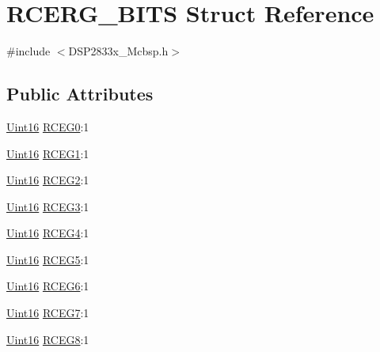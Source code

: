 \hypertarget{struct_r_c_e_r_g___b_i_t_s}{}\section{R\+C\+E\+R\+G\+\_\+\+B\+I\+T\+S Struct Reference}
\label{struct_r_c_e_r_g___b_i_t_s}


{\ttfamily \#include $<$D\+S\+P2833x\+\_\+\+Mcbsp.\+h$>$}

\subsection*{Public Attributes}
\begin{DoxyCompactItemize}
\item 
\hyperlink{_d_s_p2833x___device_8h_a59a9f6be4562c327cbfb4f7e8e18f08b}{Uint16} \hyperlink{struct_r_c_e_r_g___b_i_t_s_ac7e8c66490a11cf78d2d84137c4c1199}{R\+C\+E\+G0}\+:1
\item 
\hyperlink{_d_s_p2833x___device_8h_a59a9f6be4562c327cbfb4f7e8e18f08b}{Uint16} \hyperlink{struct_r_c_e_r_g___b_i_t_s_adff1f4f5e3f92fcac48b63d3373fcbae}{R\+C\+E\+G1}\+:1
\item 
\hyperlink{_d_s_p2833x___device_8h_a59a9f6be4562c327cbfb4f7e8e18f08b}{Uint16} \hyperlink{struct_r_c_e_r_g___b_i_t_s_a6e9a4642c25b895982d556ad4b9b5955}{R\+C\+E\+G2}\+:1
\item 
\hyperlink{_d_s_p2833x___device_8h_a59a9f6be4562c327cbfb4f7e8e18f08b}{Uint16} \hyperlink{struct_r_c_e_r_g___b_i_t_s_aca75613b41cbd9458f008501850527a0}{R\+C\+E\+G3}\+:1
\item 
\hyperlink{_d_s_p2833x___device_8h_a59a9f6be4562c327cbfb4f7e8e18f08b}{Uint16} \hyperlink{struct_r_c_e_r_g___b_i_t_s_a60858c4661110777d4750b080d5e786a}{R\+C\+E\+G4}\+:1
\item 
\hyperlink{_d_s_p2833x___device_8h_a59a9f6be4562c327cbfb4f7e8e18f08b}{Uint16} \hyperlink{struct_r_c_e_r_g___b_i_t_s_a262b2bc03ef92d7a0e7e827b1ba79d8b}{R\+C\+E\+G5}\+:1
\item 
\hyperlink{_d_s_p2833x___device_8h_a59a9f6be4562c327cbfb4f7e8e18f08b}{Uint16} \hyperlink{struct_r_c_e_r_g___b_i_t_s_a8948b5cf67bda66b92a733c96e05a37e}{R\+C\+E\+G6}\+:1
\item 
\hyperlink{_d_s_p2833x___device_8h_a59a9f6be4562c327cbfb4f7e8e18f08b}{Uint16} \hyperlink{struct_r_c_e_r_g___b_i_t_s_add2a5c26eb3b0be17fa16aa8a5a8e3b3}{R\+C\+E\+G7}\+:1
\item 
\hyperlink{_d_s_p2833x___device_8h_a59a9f6be4562c327cbfb4f7e8e18f08b}{Uint16} \hyperlink{struct_r_c_e_r_g___b_i_t_s_adfe00b9d31421c8737eb753c00d6a2ca}{R\+C\+E\+G8}\+:1

\end{DoxyCompactItemize}
